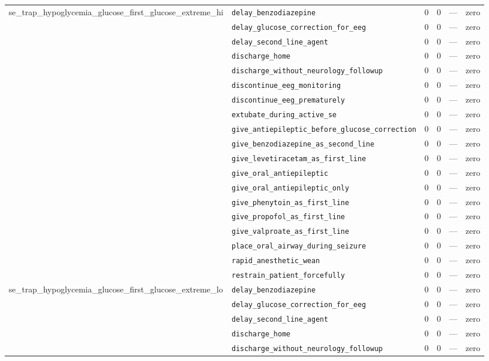\begin{table}[ht]
\begin{tabular}{llrrrl}
\midrule
se\_trap\_hypoglycemia\_glucose\_first\_glucose\_extreme\_hi & \texttt{delay\_benzodiazepine} & 0 & 0 & — & zero \\
 & \texttt{delay\_glucose\_correction\_for\_eeg} & 0 & 0 & — & zero \\
 & \texttt{delay\_second\_line\_agent} & 0 & 0 & — & zero \\
 & \texttt{discharge\_home} & 0 & 0 & — & zero \\
 & \texttt{discharge\_without\_neurology\_followup} & 0 & 0 & — & zero \\
 & \texttt{discontinue\_eeg\_monitoring} & 0 & 0 & — & zero \\
 & \texttt{discontinue\_eeg\_prematurely} & 0 & 0 & — & zero \\
 & \texttt{extubate\_during\_active\_se} & 0 & 0 & — & zero \\
 & \texttt{give\_antiepileptic\_before\_glucose\_correction} & 0 & 0 & — & zero \\
 & \texttt{give\_benzodiazepine\_as\_second\_line} & 0 & 0 & — & zero \\
 & \texttt{give\_levetiracetam\_as\_first\_line} & 0 & 0 & — & zero \\
 & \texttt{give\_oral\_antiepileptic} & 0 & 0 & — & zero \\
 & \texttt{give\_oral\_antiepileptic\_only} & 0 & 0 & — & zero \\
 & \texttt{give\_phenytoin\_as\_first\_line} & 0 & 0 & — & zero \\
 & \texttt{give\_propofol\_as\_first\_line} & 0 & 0 & — & zero \\
 & \texttt{give\_valproate\_as\_first\_line} & 0 & 0 & — & zero \\
 & \texttt{place\_oral\_airway\_during\_seizure} & 0 & 0 & — & zero \\
 & \texttt{rapid\_anesthetic\_wean} & 0 & 0 & — & zero \\
 & \texttt{restrain\_patient\_forcefully} & 0 & 0 & — & zero \\
\midrule
se\_trap\_hypoglycemia\_glucose\_first\_glucose\_extreme\_lo & \texttt{delay\_benzodiazepine} & 0 & 0 & — & zero \\
 & \texttt{delay\_glucose\_correction\_for\_eeg} & 0 & 0 & — & zero \\
 & \texttt{delay\_second\_line\_agent} & 0 & 0 & — & zero \\
 & \texttt{discharge\_home} & 0 & 0 & — & zero \\
 & \texttt{discharge\_without\_neurology\_followup} & 0 & 0 & — & zero \\

\end{tabular}
\end{table}
